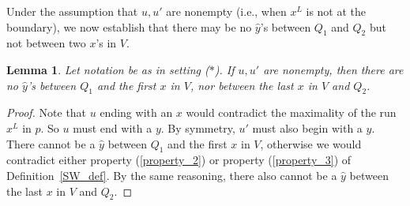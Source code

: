 \documentclass[11pt]{amsart}
\newtheorem{lemma}[theorem]{Lemma}
\newcommand{\settingstar}{{\normalfont(\hyperref[setting_star]{$\ast$})}}
\newcommand{\hatted}[1]{\widehat{#1}}
\begin{document}

    

Under the assumption that $u,u'$ are nonempty (i.e., when $x^L$ is not at the boundary), we now establish that there may be no $\hatted{y}$'s between $Q_1$ and $Q_2$ but not between two $x$'s in $V$.

\begin{lemma}\label{nonempty_no_hatted_ys}
     Let notation be as in setting \settingstar. If $u,u'$ are nonempty, then there are no $\hatted{y}$'s between $Q_1$ and the first $x$ in $V$, nor between the last $x$ in $V$ and $Q_2$.
\end{lemma}

\begin{proof}
    Note that $u$ ending with an $x$ would contradict the maximality of the run $x^L$ in $p$. So $u$ must end with a $y$. By symmetry, $u'$ must also begin with a $y$. There cannot be a $\hatted{y}$ between $Q_1$ and the first $x$ in $V$, otherwise we would contradict either property (\ref{property_2}) or property (\ref{property_3}) of Definition~\ref{SW_def}. By the same reasoning, there also cannot be a $\hatted{y}$ between the last $x$ in $V$ and $Q_2$.
\end{proof}

\end{document}
